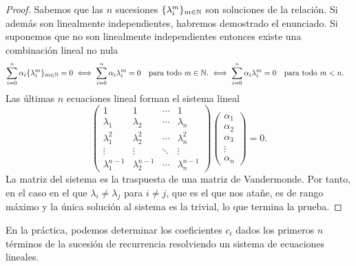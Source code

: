 \begin{proof}
    Sabemos que las $n$ sucesiones $\{\lambda_i^m\}_{m \in \mathbb{N}}$
    son soluciones de la relación.
    Si además son linealmente independientes,
    habremos demostrado el enunciado.
    Si suponemos que no son linealmente independientes entonces
    existe una combinación lineal no nula
    \begin{equation*}
        \sum_{i=0}^n \alpha_i \{\lambda_i^m\}_{m \in \N} = 0 \iff
        \sum_{i=0}^n \alpha_i \lambda_i^m = 0
            \quad \text{para todo $m \in \N$.} \iff
        \sum_{i=0}^n \alpha_i \lambda_i^m = 0 \qq{para todo $m < n$.}
    \end{equation*}
    Las últimas $n$ ecuaciones lineal forman el sistema lineal
    \begin{equation*}
        \begin{pmatrix}
            1 & 1 & \cdots & 1 \\
            \lambda_1 & \lambda_2 & \cdots & \lambda_n \\
            \lambda_1^2 & \lambda_2^2 & \cdots & \lambda_n^2 \\
            \vdots & \vdots & \ddots & \vdots \\
            \lambda_1^{n-1} & \lambda_2^{n-1} & \cdots & \lambda_n^{n-1}
        \end{pmatrix}
        \begin{pmatrix}
            \alpha_1 \\ \alpha_2 \\ \alpha_3 \\ \vdots \\ \alpha_n
        \end{pmatrix}
        = 0.
    \end{equation*}
    La matriz del sistema es la traspuesta de una matriz de Vandermonde.
    Por tanto, en el caso en el que $\lambda_i \ne \lambda_j$ para $i \ne j$,
    que es el que nos atañe,
    es de rango máximo y la única solución al sistema es la trivial,
    lo que termina la prueba.
\end{proof}

\begin{remark}
    En la práctica, podemos determinar los coeficientes $c_i$
    dados los primeros $n$ términos de la sucesión de recurrencia
    resolviendo un sistema de ecuaciones lineales.
\end{remark}

